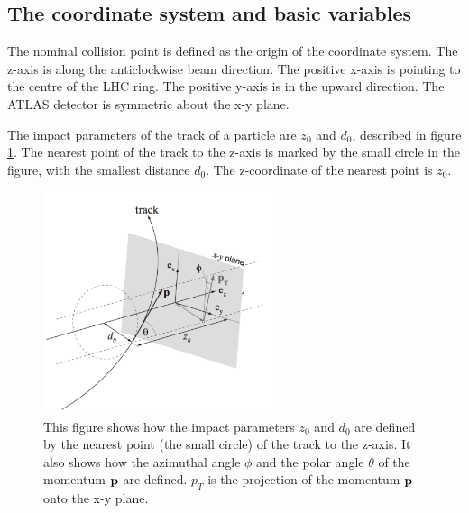 \subsection{The coordinate system and basic variables}
The nominal collision point is defined as the origin of the coordinate system.
The z-axis is along the anticlockwise beam direction.
The positive x-axis is pointing to the centre of the LHC ring.
The positive y-axis is in the upward direction.
The ATLAS detector is symmetric about the x-y plane.

The impact parameters of the track of a particle are $z_0$ and $d_0$, described in figure \ref{fig:impact_parameter}.
The nearest point of the track to the z-axis is marked by the small circle in the figure, with the smallest distance $d_0$.
The z-coordinate of the nearest point is $z_0$.

\begin{figure}
\centering
\includegraphics[width=0.6\textwidth]{data/photo/detector/impact_parameter.png}
\caption{This figure shows how the impact parameters $z_0$ and $d_0$ are defined by the nearest point (the small circle) of the track to the z-axis. It also shows how the azimuthal angle $\phi$ and the polar angle $\theta$ of the momentum $\bf{p}$ are defined. $p_T$ is the projection of the momentum $\bf{p}$ onto the x-y plane.}
\label{fig:impact_parameter}
\end{figure}


